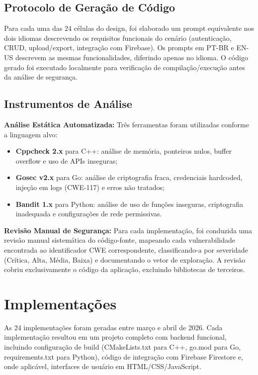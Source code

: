 \documentclass[12pt]{article}
\begin{document}
\subsection{Protocolo de Geração de Código}

Para cada uma das 24 células do design, foi elaborado um prompt equivalente nos dois idiomas descrevendo os requisitos funcionais do cenário (autenticação, CRUD, upload/export, integração com Firebase). Os prompts em PT-BR e EN-US descrevem as mesmas funcionalidades, diferindo apenas no idioma. O código gerado foi executado localmente para verificação de compilação/execução antes da análise de segurança.

\subsection{Instrumentos de Análise}

\textbf{Análise Estática Automatizada:} Três ferramentas foram utilizadas conforme a linguagem alvo:
\begin{itemize}
  \item \textbf{Cppcheck 2.x} para C++: análise de memória, ponteiros nulos, buffer overflow e uso de APIs inseguras;
  \item \textbf{Gosec v2.x} para Go: análise de criptografia fraca, credenciais hardcoded, injeção em logs (CWE-117) e erros não tratados;
  \item \textbf{Bandit 1.x} para Python: análise de uso de funções inseguras, criptografia inadequada e configurações de rede permissivas.
\end{itemize}

\textbf{Revisão Manual de Segurança:} Para cada implementação, foi conduzida uma revisão manual sistemática do código-fonte, mapeando cada vulnerabilidade encontrada ao identificador CWE correspondente, classificando-a por severidade (Crítica, Alta, Média, Baixa) e documentando o vetor de exploração. A revisão cobriu exclusivamente o código da aplicação, excluindo bibliotecas de terceiros.

\section{Implementações}
\label{sec:implementacoes}

As 24 implementações foram geradas entre março e abril de 2026. Cada implementação resultou em um projeto completo com backend funcional, incluindo configuração de build (CMakeLists.txt para C++, go.mod para Go, requirements.txt para Python), código de integração com Firebase Firestore e, onde aplicável, interfaces de usuário em HTML/CSS/JavaScript.
\end{document}
